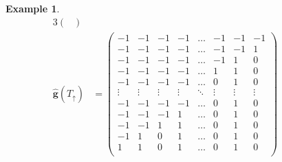 \documentclass{amsart}
\theoremstyle{definition}
\newtheorem{example}[theorem]{Example}
\renewcommand{\b}[1]{{\boldsymbol{#1}}} %
\begin{document}
\begin{example}
\begin{table}[p]
\begin{alignat*}{3}
\begin{pmatrix}
	\end{pmatrix}
	\\[.3cm]
	\hat{\b{g}}(T_\uparrow) & = \begin{pmatrix}
		-1 & -1 & -1 & -1 & \dots & -1 & -1 & -1 \\
		-1 & -1 & -1 & -1 & \dots & -1 & -1 & 1 \\
		-1 & -1 & -1 & -1 & \dots & -1 & 1 & 0 \\
		-1 & -1 & -1 & -1 & \dots & 1 & 1 & 0 \\
		-1 & -1 & -1 & -1 & \dots & 0 & 1 & 0 \\
		\vdots & \vdots & \vdots & \vdots & \ddots & \vdots & \vdots & \vdots \\
		-1 & -1 & -1 & -1 & \dots & 0 & 1 & 0 \\
		-1 & -1 & -1 & 1 & \dots & 0 & 1 & 0 \\
		-1 & -1 & 1 & 1 & \dots & 0 & 1 & 0 \\
		-1 & 1 & 0 & 1 & \dots & 0 & 1 & 0 \\
		1 & 1 & 0 & 1 & \dots & 0 & 1 & 0 \\
	\end{pmatrix}
	\qquad &

\end{alignat*}
\end{table}
\end{example}
\end{document}
